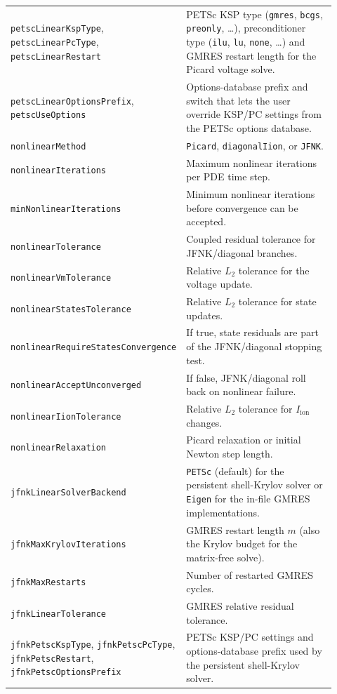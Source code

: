 \documentclass[11pt,a4paper]{article}
\newcommand{\code}[1]{\texttt{\small #1}}
\newcommand{\Iion}{I_{\mathrm{ion}}}
\begin{document}
\begin{longtable}{@{}p{0.34\linewidth}p{0.58\linewidth}@{}}
\code{petscLinearKspType}, \code{petscLinearPcType}, \code{petscLinearRestart} & PETSc KSP type (\code{gmres}, \code{bcgs}, \code{preonly}, \ldots), preconditioner type (\code{ilu}, \code{lu}, \code{none}, \ldots) and GMRES restart length for the Picard voltage solve. \\
\code{petscLinearOptionsPrefix}, \code{petscUseOptions} & Options-database prefix and switch that lets the user override KSP/PC settings from the PETSc options database. \\
\code{nonlinearMethod} & \code{Picard}, \code{diagonalIion}, or \code{JFNK}. \\
\code{nonlinearIterations} & Maximum nonlinear iterations per PDE time step. \\
\code{minNonlinearIterations} & Minimum nonlinear iterations before convergence can be accepted. \\
\code{nonlinearTolerance} & Coupled residual tolerance for JFNK/diagonal branches. \\
\code{nonlinearVmTolerance} & Relative $L_2$ tolerance for the voltage update. \\
\code{nonlinearStatesTolerance} & Relative $L_2$ tolerance for state updates. \\
\code{nonlinearRequireStatesConvergence} & If true, state residuals are part of the JFNK/diagonal stopping test. \\
\code{nonlinearAcceptUnconverged} & If false, JFNK/diagonal roll back on nonlinear failure. \\
\code{nonlinearIionTolerance} & Relative $L_2$ tolerance for $\Iion$ changes. \\
\code{nonlinearRelaxation} & Picard relaxation or initial Newton step length. \\
\code{jfnkLinearSolverBackend} & \code{PETSc} (default) for the persistent shell-Krylov solver or \code{Eigen} for the in-file GMRES implementations. \\
\code{jfnkMaxKrylovIterations} & GMRES restart length $m$ (also the Krylov budget for the matrix-free solve). \\
\code{jfnkMaxRestarts} & Number of restarted GMRES cycles. \\
\code{jfnkLinearTolerance} & GMRES relative residual tolerance. \\
\code{jfnkPetscKspType}, \code{jfnkPetscPcType}, \code{jfnkPetscRestart}, \code{jfnkPetscOptionsPrefix} & PETSc KSP/PC settings and options-database prefix used by the persistent shell-Krylov solver. \\

\end{longtable}
\end{document}
